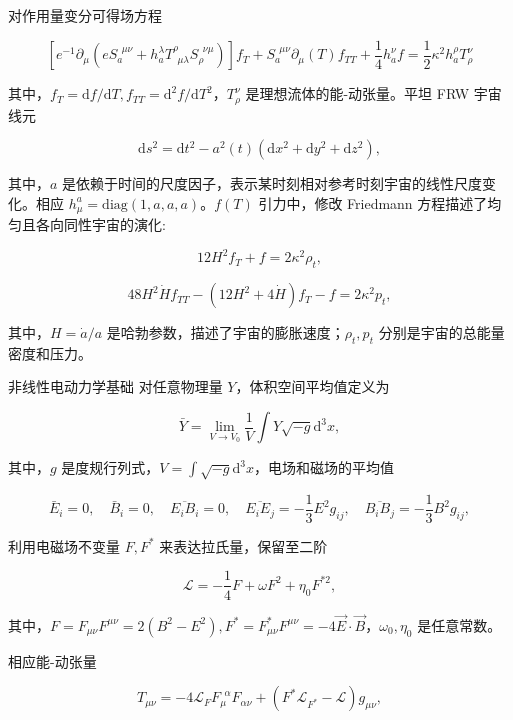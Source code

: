 \documentclass[9pt, dvipsnames]{beamer} %
\begin{document}
\begin{frame}
    对作用量变分可得场方程

    $$
    \left[e^{-1}\partial_\mu \left(e S_a^{~~\mu\nu} + h_a^\lambda T^\rho_{~~\mu\lambda} S_\rho^{~~\nu\mu} \right) \right] f_T + S_a^{~~\mu\nu} \partial_\mu(T) f_{TT} + \frac{1 }{4 } h_a^\nu f
    =\frac{1 }{2 } \kappa^2 h_a^\rho T_\rho^\nu
    $$
    
    其中，$f_T=\mathrm{d}f/\mathrm{d}T,f_{TT}=\mathrm{d}^2f/\mathrm{d}T^2$，$T_\rho^\nu$ 是理想流体的能-动张量。平坦 FRW 宇宙线元

    $$
    \mathrm{d}s^2
    =\mathrm{d}t^2 - a^2(t)\left(\mathrm{d}x^2+\mathrm{d}y^2+\mathrm{d}z^2 \right),
    $$

    其中，$a$ 是依赖于时间的尺度因子，表示某时刻相对参考时刻宇宙的线性尺度变化。相应 $h_\mu^a=\mathrm{diag}(1,a,a,a)$。$f(T)$ 引力中，修改 Friedmann 方程描述了均匀且各向同性宇宙的演化:

    $$
    12 H^2 f_T + f = 2\kappa^2 \rho_t,
    $$

    $$
    48H^2\dot{H} f_{TT} - \left(12 H^2 + 4\dot{H} \right) f_T - f= 2\kappa^2 p_t,
    $$

    其中，$H=\dot{a}/a$ 是哈勃参数，描述了宇宙的膨胀速度；$\rho_t,p_t$ 分别是宇宙的总能量密度和压力。
\end{frame}

\begin{frame}{非线性电动力学基础}
    对任意物理量 $Y$，体积空间平均值定义为

    $$
    \bar{Y}
    =\lim_{V\to V_0} \frac{1 }{V } \int Y\sqrt{-g} \mathrm{d}^3 x,
    $$

    其中，$g$ 是度规行列式，$\displaystyle{V=\int\sqrt{-g}\mathrm{d}^3 x } $，电场和磁场的平均值

    $$
    \bar{E}_i = 0,\quad
    \bar{B}_i = 0,\quad
    \overline{E_i B_i} = 0,\quad
    \overline{E_i E_j} = -\frac{1 }{3 } E^2 g_{ij},\quad
    \overline{B_i B_j} = -\frac{1 }{3 } B^2 g_{ij},
    $$

    利用电磁场不变量 $F,F^*$ 来表达拉氏量，保留至二阶

    $$
    \mathcal{L}=-\frac{1 }{4 } F + \omega F^2 + \eta_0 F^{*2},
    $$

    其中，$F=F_{\mu\nu} F^{\mu\nu}=2(B^2-E^2),F^*=F_{\mu\nu}^*F^{\mu\nu}=-4\vec{E}\cdot\vec{B}$，$\omega_0,\eta_0$ 是任意常数。

    相应能-动张量

    $$
    T_{\mu\nu}
    =-4\mathcal{L}_F F_\mu^{~~\alpha} F_{\alpha\nu} + \left(F^* \mathcal{L}_{F^*} - \mathcal{L} \right) g_{\mu\nu},
    $$

\end{frame}
\end{document}
